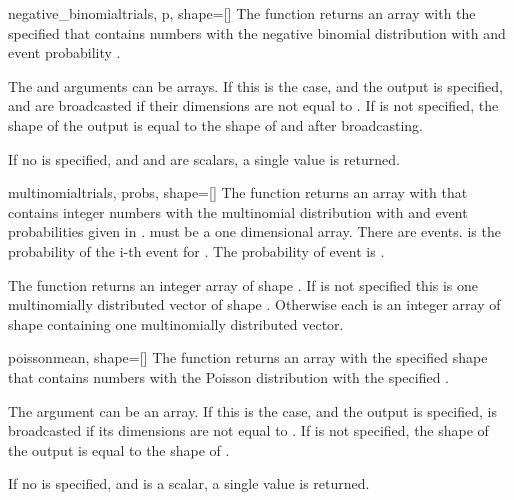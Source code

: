 \begin{funcdesc}{negative_binomial}{trials, p, shape=[]}
  The  function returns an array with the specified
   that contains  numbers with the negative binomial
  distribution with  and event probability .
   
  The  and  arguments can be arrays. If this is the case,
  and the output  is specified,  and  are
  broadcasted if their dimensions are not equal to . If 
  is not specified, the shape of the output is equal to the shape of
   and  after broadcasting.
   
   If no  is specified, and  and  are scalars,
   a single value is returned.
\end{funcdesc}

\begin{funcdesc}{multinomial}{trials, probs, shape=[]}
   The  function returns an array with that contains
   integer numbers with the multinomial distribution with  and
   event probabilities given in .   must be a one
   dimensional array.  There are  events.  is
   the probability of the i-th event for . The
   probability of event  is .
   
   The function returns an integer array of shape
   .  If  is not specified this is one
   multinomially distributed vector of shape .  Otherwise
   each  is an integer array of shape
    containing one multinomially distributed vector.
\end{funcdesc}

\begin{funcdesc}{poisson}{mean, shape=[]}
   The  function returns an array with the specified shape
   that contains  numbers with the Poisson distribution with the
   specified .
   
   The  argument can be an array. If this is the case, and the output
    is specified,  is broadcasted if its dimensions are
   not equal to . If  is not specified, the shape of the
   output is equal to the shape of .
   
   If no  is specified, and  is a scalar, a single value
   is returned.
\end{funcdesc}



